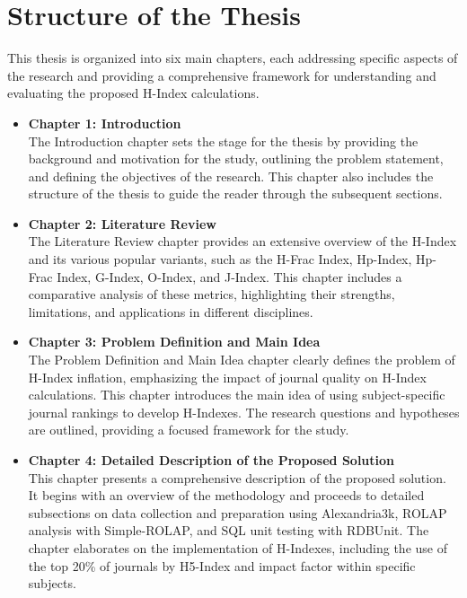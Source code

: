 \section{Structure of the Thesis}
This thesis is organized into six main chapters, each addressing specific
aspects of the research and providing a comprehensive framework for
understanding and evaluating the proposed H-Index calculations.
\begin{itemize}
      \item \textbf{Chapter 1: Introduction} \\
            The Introduction chapter sets the stage for the thesis by providing the background and motivation for the study, outlining the problem statement, and defining the objectives of the research. This chapter also includes the structure of the thesis to guide the reader through the subsequent sections.

      \item \textbf{Chapter 2: Literature Review} \\
            The Literature Review chapter provides an extensive overview of the H-Index and its various popular variants, such as the H-Frac Index, Hp-Index, Hp-Frac Index, G-Index, O-Index, and J-Index. This chapter includes a comparative analysis of these metrics, highlighting their strengths, limitations, and applications in different disciplines.

      \item \textbf{Chapter 3: Problem Definition and Main Idea} \\
            The Problem Definition and Main Idea chapter clearly defines the problem of H-Index inflation, emphasizing the impact of journal quality on H-Index calculations. This chapter introduces the main idea of using subject-specific journal rankings to develop H-Indexes. The research questions and hypotheses are outlined, providing a focused framework for the study.

      \item \textbf{Chapter 4: Detailed Description of the Proposed Solution} \\
            This chapter presents a comprehensive description of the proposed solution.
            It begins with an overview of the methodology and proceeds to detailed subsections
            on data collection and preparation using Alexandria3k, ROLAP analysis with Simple-ROLAP,
            and SQL unit testing with RDBUnit. The chapter elaborates on the implementation of H-Indexes,
            including the use of the top 20\% of journals by H5-Index and impact factor within specific subjects.


\end{itemize}

